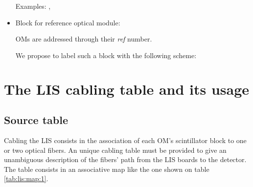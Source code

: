 \documentclass[12pt,a4paper]{article}
\begin{document}
\begin{itemize}
  \par\noindent Examples: , 
  
\item  Block for  reference  optical module:
  
  \par  OMs are  addressed  through their \emph{ref}  number.
  
  \par We propose to  label such a  block with the following scheme:
  \begin{center}
  \end{center}

\end{itemize}


\section{The LIS cabling table and its usage}

\subsection{Source table}

Cabling the LIS consists in  the association of each OM's scintillator
block to one  or two optical fibers.  An unique  cabling table must be
provided to give  an unambiguous description of the  fibers' path from
the LIS boards to the detector.   The table consists in an associative
map like the one shown on table \ref{tab:lis:map:1}.
\end{document}
